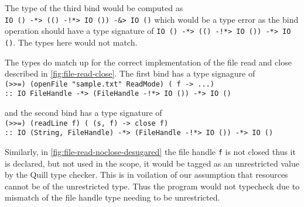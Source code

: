 The type of the third bind would be computed as \\
\texttt{IO () -*> (() -!*> IO ()) -&> IO ()} which would be a type error
as the bind operation should have a type signature of
\texttt{IO () -*> (() -!*> IO ()) -*> IO ()}. The types here would not match.

The types do match up for the correct implementation of the file read and close described in \cref{fig:file-read-close}.
The first bind has a type signagure of\\
\texttt{(>>=) (openFile "sample.txt" ReadMode) (\ f -> ...)}\\
\texttt{:: IO FileHandle -*> (FileHandle -!*> IO ()) -*> IO ()}

and the second bind has a type signature of\\
\texttt{(>>=) (readLine f) (\ (s, f) -> close f)}\\
\texttt{:: IO (String, FileHandle) -*> (FileHandle -!*> IO ()) -*> IO ()}

Similarly, in \cref{fig:file-read-noclose-desugared} the file handle \texttt{f} is not closed thus it is declared, but not used
in the scope, it would be tagged as an unrestricted value by the Quill type checker.
This is in voilation of our assumption that resources cannot be of the unrestricted type. Thus
the program would not typecheck due to mismatch of the file handle type needing to be unrestricted.


